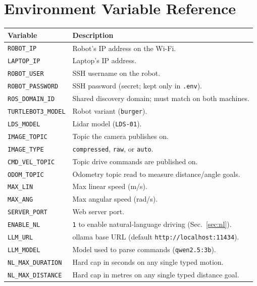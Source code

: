 \documentclass[11pt,a4paper]{article}
\newcommand{\code}[1]{\texttt{#1}}
\begin{document}
\appendix
\section{Environment Variable Reference}
\label{app:env}
\begin{table}[h]
\centering
\begin{tabular}{@{}ll@{}}
\toprule
\textbf{Variable} & \textbf{Description} \\
\midrule
\code{ROBOT\_IP}        & Robot's IP address on the Wi-Fi. \\
\code{LAPTOP\_IP}       & Laptop's IP address. \\
\code{ROBOT\_USER}      & SSH username on the robot. \\
\code{ROBOT\_PASSWORD}  & SSH password (secret; kept only in \code{.env}). \\
\code{ROS\_DOMAIN\_ID}  & Shared discovery domain; must match on both machines. \\
\code{TURTLEBOT3\_MODEL}& Robot variant (\code{burger}). \\
\code{LDS\_MODEL}       & Lidar model (\code{LDS-01}). \\
\code{IMAGE\_TOPIC}     & Topic the camera publishes on. \\
\code{IMAGE\_TYPE}      & \code{compressed}, \code{raw}, or \code{auto}. \\
\code{CMD\_VEL\_TOPIC}  & Topic drive commands are published on. \\
\code{ODOM\_TOPIC}      & Odometry topic read to measure distance/angle goals. \\
\code{MAX\_LIN}         & Max linear speed (m/s). \\
\code{MAX\_ANG}         & Max angular speed (rad/s). \\
\code{SERVER\_PORT}     & Web server port. \\
\code{ENABLE\_NL}       & \code{1} to enable natural-language driving (Sec.~\ref{sec:nl}). \\
\code{LLM\_URL}         & ollama base URL (default \code{http://localhost:11434}). \\
\code{LLM\_MODEL}       & Model used to parse commands (\code{qwen2.5:3b}). \\
\code{NL\_MAX\_DURATION}& Hard cap in seconds on any single typed motion. \\
\code{NL\_MAX\_DISTANCE}& Hard cap in metres on any single typed distance goal. \\

\end{tabular}
\end{table}
\end{document}
